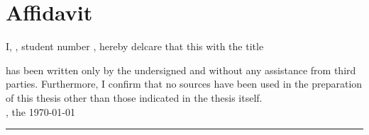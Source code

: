 
\chapter*{Affidavit}

\thispagestyle{empty}

I, \myAuthor, student number \studentno, hereby delcare that this \kind\xspace with the title

\begin{quote}
\textit{\myTitle} \textit{\mySubtitle}
\end{quote}

has been written only by the undersigned and without any assistance from third parties.
Furthermore, I confirm that no sources have been used in the preparation of this thesis other than those indicated in the thesis itself. \\[6ex]

\place, the \today\\[3ex]


\rule[-0.2cm]{5cm}{0.5pt}

\textsc{\myAuthor} 
